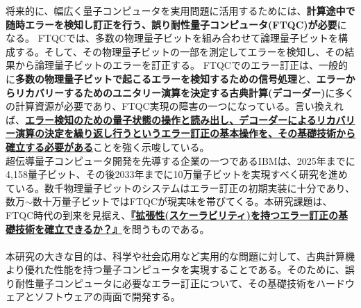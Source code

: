 \documentclass[11pt,a4j,dvipdfmx]{jarticle} 					%
\newcommand{\研究課題名}{誤り耐性量子コンピュータに向けた誤り訂正技術の開発(仮)}
\newcommand{\研究機関名}{東京大学}
\newcommand{\研究代表者氏名}{寺師弘二}
\newcommand{\研究期間の最終元号年度}{10}  %
\newcommand{\mybf}[1]{{\bfseries\sffamily#1}}
\begin{document}
将来的に、幅広く量子コンピュータを実用問題に活用するためには、\mybf{計算途中で随時エラーを検知し訂正を行う、誤り耐性量子コンピュータ(FTQC)が必要}になる。
FTQCでは、多数の物理量子ビットを組み合わせて論理量子ビットを構成する。そして、その物理量子ビットの一部を測定してエラーを検知し、その結果から論理量子ビットのエラーを訂正する。
FTQCでのエラー訂正は、一般的に\mybf{多数の物理量子ビットで起こるエラーを検知するための信号処理}と、\mybf{エラーからリカバリーするためのユニタリー演算を決定する古典計算(デコーダー)}に多くの計算資源が必要であり、FTQC実現の障害の一つになっている。言い換えれば、\mybf{\ul{エラー検知のための量子状態の操作と読み出し、デコーダーによるリカバリー演算の決定を繰り返し行うというエラー訂正の基本操作を、その基礎技術から確立する必要がある}}ことを強く示唆している。\\

超伝導量子コンピュータ開発を先導する企業の一つであるIBMは、2025年までに4,158量子ビット、その後2033年までに10万量子ビットを実現すべく研究を進めている。数千物理量子ビットのシステムはエラー訂正の初期実装に十分であり、数万$\sim$数十万量子ビットではFTQCが現実味を帯びてくる。本研究課題は、FTQC時代の到来を見据え、\mybf{\ul{『拡張性(スケーラビリティ)を持つエラー訂正の基礎技術を確立できるか？』}}を問うものである。\\

\\
本研究の大きな目的は、科学や社会応用など実用的な問題に対して、古典計算機より優れた性能を持つ量子コンピュータを実現することである。そのために、誤り耐性量子コンピュータに必要なエラー訂正について、その基礎技術をハードウェアとソフトウェアの両面で開発する。 \\
\end{document}
